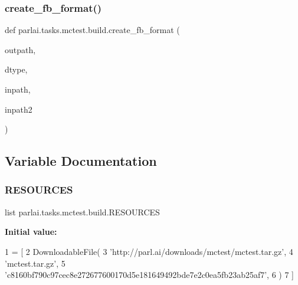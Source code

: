 \mbox{\label{namespaceparlai_1_1tasks_1_1mctest_1_1build_a7d827f19f83b7d60f4ed1dbabade06cf}} 
\subsubsection{\texorpdfstring{create\+\_\+fb\+\_\+format()}{create\_fb\_format()}}
{\footnotesize\ttfamily def parlai.\+tasks.\+mctest.\+build.\+create\+\_\+fb\+\_\+format (\begin{DoxyParamCaption}\item[{}]{outpath,  }\item[{}]{dtype,  }\item[{}]{inpath,  }\item[{}]{inpath2 }\end{DoxyParamCaption})}



\subsection{Variable Documentation}
\mbox{\label{namespaceparlai_1_1tasks_1_1mctest_1_1build_ae23b1fa264022eda3f280b6a5067b009}} 
\subsubsection{\texorpdfstring{R\+E\+S\+O\+U\+R\+C\+ES}{RESOURCES}}
{\footnotesize\ttfamily list parlai.\+tasks.\+mctest.\+build.\+R\+E\+S\+O\+U\+R\+C\+ES}

{\bfseries Initial value\+:}
\begin{DoxyCode}
1 =  [
2     DownloadableFile(
3         \textcolor{stringliteral}{'http://parl.ai/downloads/mctest/mctest.tar.gz'},
4         \textcolor{stringliteral}{'mctest.tar.gz'},
5         \textcolor{stringliteral}{'c8160bf790c97cec8e272677600170d5e181649492bde7e2c0ea5fb23ab25af7'},
6     )
7 ]
\end{DoxyCode}

